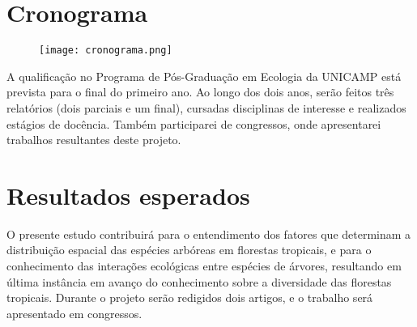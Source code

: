 \documentclass[twoside,12pt,a4paper]{report}
\begin{document}
\section{Cronograma}

	\begin{figure}[ht]
		\centering \texttt{[image: cronograma.png]}
    \end{figure}

A qualificação no Programa de Pós-Graduação em Ecologia da UNICAMP está prevista para o final do
primeiro ano. Ao longo dos dois anos, serão feitos três relatórios (dois parciais e um final),
cursadas disciplinas de interesse e realizados estágios de docência. Também participarei de
congressos, onde apresentarei trabalhos resultantes deste projeto.

\section{Resultados esperados}
O presente estudo contribuirá para o entendimento dos fatores que determinam a distribuição espacial
das espécies arbóreas em florestas tropicais, e para o conhecimento das interações ecológicas entre
espécies de árvores, resultando em última instância em avanço do conhecimento sobre a diversidade
das florestas tropicais. Durante o projeto serão redigidos dois artigos, e o trabalho será apresentado
em congressos.



    
    
\end{document}
